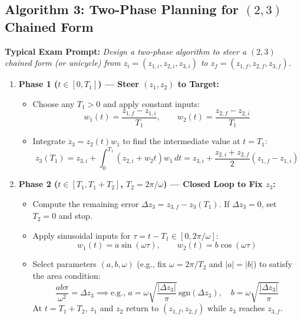 \documentclass[10pt, a4paper]{article}
\begin{document}
\subsection*{Algorithm 3: Two-Phase Planning for $(2,3)$ Chained Form}
\textbf{Typical Exam Prompt:} \textit{Design a two-phase algorithm to steer a $(2,3)$ chained form (or unicycle) from $z_i = (z_{1,i}, z_{2,i}, z_{3,i})$ to $z_f = (z_{1,f}, z_{2,f}, z_{3,f})$.}
\begin{enumerate}
    \item \textbf{Phase 1 ($t \in [0, T_1]$) — Steer $(z_1, z_2)$ to Target:}
    \begin{itemize}
        \item Choose any $T_1 > 0$ and apply constant inputs:
        \[
            w_1(t) = \frac{z_{1,f} - z_{1,i}}{T_1}, \qquad w_2(t) = \frac{z_{2,f} - z_{2,i}}{T_1}
        \]
        \item Integrate $\dot{z}_3 = z_2(t) w_1$ to find the intermediate value at $t = T_1$:
        \[
            z_3(T_1) = z_{3,i} + \int_0^{T_1} \left(z_{2,i} + w_2 t\right) w_1 \, dt = z_{3,i} + \frac{z_{2,i} + z_{2,f}}{2}(z_{1,f} - z_{1,i})
        \]
    \end{itemize}
    \item \textbf{Phase 2 ($t \in [T_1, T_1 + T_2]$, $T_2 = 2\pi/\omega$) — Closed Loop to Fix $z_3$:}
    \begin{itemize}
        \item Compute the remaining error $\Delta z_3 = z_{3,f} - z_3(T_1)$. If $\Delta z_3 = 0$, set $T_2 = 0$ and stop.
        \item Apply sinusoidal inputs for $\tau = t - T_1 \in [0, 2\pi/\omega]$:
        \[
            w_1(t) = a\sin(\omega\tau), \qquad w_2(t) = b\cos(\omega\tau)
        \]
        \item Select parameters $(a, b, \omega)$ (e.g., fix $\omega = 2\pi/T_2$ and $|a| = |b|$) to satisfy the area condition:
        \[
            \frac{ab\pi}{\omega^2} = \Delta z_3 \implies \text{e.g., } a = \omega\sqrt{\frac{|\Delta z_3|}{\pi}}\,\text{sgn}(\Delta z_3), \quad b = \omega\sqrt{\frac{|\Delta z_3|}{\pi}}
        \]
        At $t = T_1 + T_2$, $z_1$ and $z_2$ return to $(z_{1,f}, z_{2,f})$ while $z_3$ reaches $z_{3,f}$.
    \end{itemize}
\end{enumerate}
\end{document}
